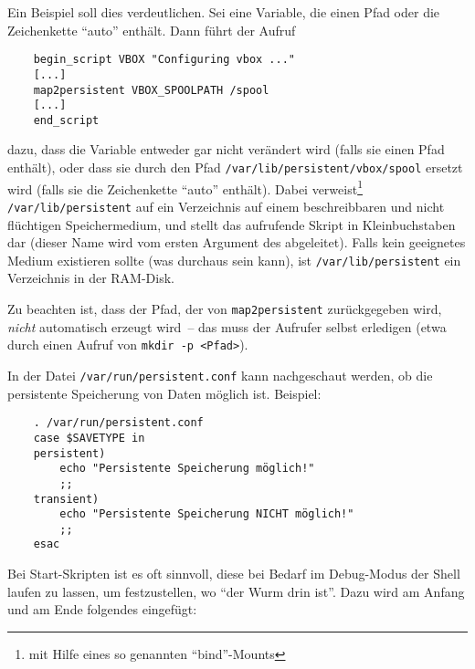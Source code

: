 Ein Beispiel soll dies verdeutlichen. Sei  eine Variable,
die einen Pfad oder die Zeichenkette "`auto"' enthält. Dann führt der Aufruf

\begin{example}
\begin{verbatim}
    begin_script VBOX "Configuring vbox ..."
    [...]
    map2persistent VBOX_SPOOLPATH /spool
    [...]
    end_script
\end{verbatim}
\end{example}

dazu, dass die Variable  entweder gar nicht verändert
wird (falls sie einen Pfad enthält), oder dass sie durch den Pfad
\texttt{/var/lib/persistent/vbox/spool} ersetzt wird (falls sie die Zeichenkette
"`auto"' enthält). Dabei verweist\footnote{mit Hilfe eines so genannten
"`bind"'-Mounts} \texttt{/var/lib/persistent} auf ein
Verzeichnis auf einem beschreibbaren und nicht flüchtigen Speichermedium, und
 stellt das aufrufende Skript in Kleinbuchstaben dar (dieser Name
wird vom ersten Argument des
 abgeleitet).
Falls kein geeignetes Medium existieren sollte (was durchaus sein kann),
ist \texttt{/var/lib/persistent} ein Verzeichnis in der RAM-Disk.

Zu beachten ist, dass der Pfad, der von \texttt{map2persistent} zurückgegeben
wird, \emph{nicht} automatisch erzeugt wird~-- das muss der Aufrufer selbst
erledigen (etwa durch einen Aufruf von \texttt{mkdir -p <Pfad>}).

In der Datei \texttt{/var/run/persistent.conf} kann nachgeschaut werden, ob
die persistente Speicherung von Daten möglich ist. Beispiel:

\begin{example}
\begin{verbatim}
    . /var/run/persistent.conf
    case $SAVETYPE in
    persistent)
        echo "Persistente Speicherung möglich!"
        ;;
    transient)
        echo "Persistente Speicherung NICHT möglich!"
        ;;
    esac
\end{verbatim}
\end{example}


    Bei Start-Skripten ist es oft sinnvoll, diese bei Bedarf im Debug-Modus
    der Shell laufen zu lassen, um festzustellen, wo "`der Wurm drin ist"'.
    Dazu wird am Anfang und am Ende folgendes eingefügt:


